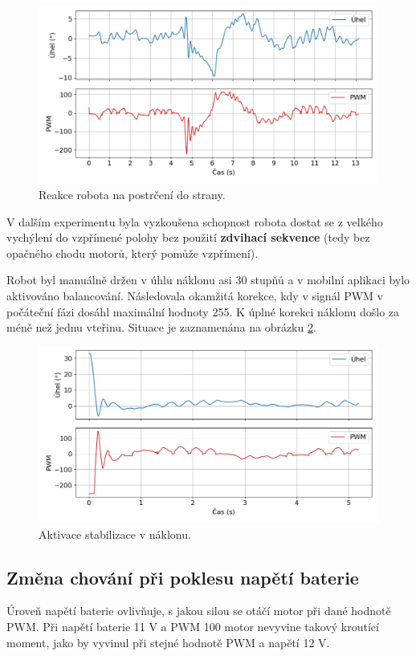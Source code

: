 \begin{figure}[H]
  \centering
  \includegraphics[width=1.0\linewidth]{obrazky-figures/push.png}%
  \caption{Reakce robota na postrčení do strany.}
  \label{push}
\end{figure}

V dalším experimentu byla vyzkoušena schopnost robota dostat se z velkého vychýlení do vzpřímené polohy bez použití \textbf{zdvihací sekvence} (tedy bez opačného chodu motorů, který pomůže vzpřímení).

Robot byl manuálně držen v úhlu náklonu asi 30 stupňů a v mobilní aplikaci bylo aktivováno balancování. Následovala okamžitá korekce, kdy v signál PWM v počáteční fázi dosáhl maximální hodnoty 255. K úplné korekci náklonu došlo za méně než jednu vteřinu. Situace je zaznamenána na obrázku \ref{off}.

\begin{figure}[H]
  \centering
  \includegraphics[width=1.0\linewidth]{obrazky-figures/off.png}%
  \caption{Aktivace stabilizace v náklonu.}
  \label{off}
\end{figure}

\subsection*{Změna chování při poklesu napětí baterie}
Úroveň napětí baterie ovlivňuje, s jakou silou se otáčí motor při dané hodnotě PWM. Při napětí baterie 11 V a PWM 100 motor nevyvine takový kroutící moment, jako by vyvinul při stejné hodnotě PWM a napětí 12 V.

